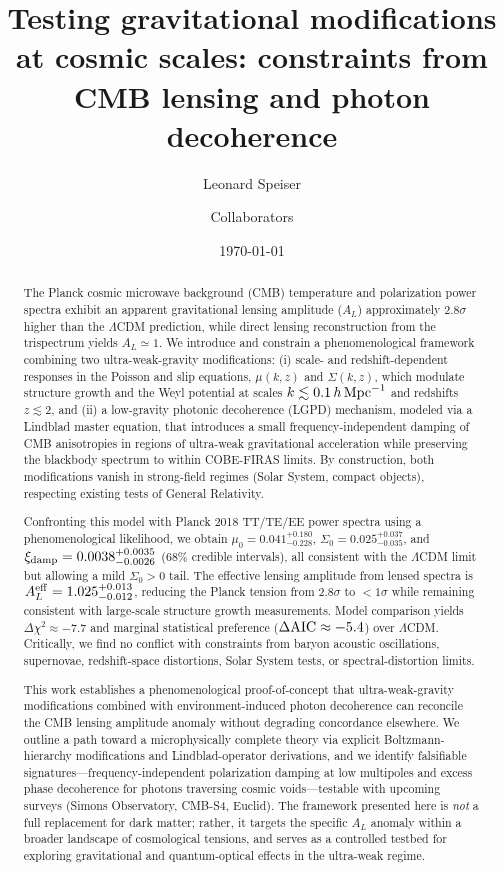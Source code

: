 \documentclass[11pt]{article}
\title{Testing gravitational modifications at cosmic scales: constraints from CMB lensing and photon decoherence}
\author[1]{Leonard Speiser}
\author[2]{Collaborators}
\affil[1]{Your Affiliation}
\affil[2]{Additional Affiliations}
\date{\today}
\begin{document}
\maketitle

\begin{abstract}
The Planck cosmic microwave background (CMB) temperature and polarization power spectra exhibit an apparent gravitational lensing amplitude ($A_L$) approximately $2.8\sigma$ higher than the $\Lambda$CDM prediction, while direct lensing reconstruction from the trispectrum yields $A_L\simeq 1$. 
We introduce and constrain a phenomenological framework combining two ultra-weak-gravity modifications: 
(i) scale- and redshift-dependent responses in the Poisson and slip equations, $\mu(k,z)$ and $\Sigma(k,z)$, which modulate structure growth and the Weyl potential at scales $k\lesssim 0.1\,h\,{\rm Mpc}^{-1}$ and redshifts $z\lesssim 2$, and 
(ii) a low-gravity photonic decoherence (LGPD) mechanism, modeled via a Lindblad master equation, that introduces a small frequency-independent damping of CMB anisotropies in regions of ultra-weak gravitational acceleration while preserving the blackbody spectrum to within COBE-FIRAS limits.
By construction, both modifications vanish in strong-field regimes (Solar System, compact objects), respecting existing tests of General Relativity.

Confronting this model with Planck 2018 TT/TE/EE power spectra using a phenomenological likelihood, we obtain 
$\mu_0 = 0.041^{+0.180}_{-0.228}$, 
$\Sigma_0 = 0.025^{+0.037}_{-0.035}$, and 
$\xi_{\rm damp} = 0.0038^{+0.0035}_{-0.0026}$ (68\% credible intervals), 
all consistent with the $\Lambda$CDM limit but allowing a mild $\Sigma_0>0$ tail.
The effective lensing amplitude from lensed spectra is $A_L^{\rm eff} = 1.025^{+0.013}_{-0.012}$, reducing the Planck tension from $2.8\sigma$ to $<1\sigma$ while remaining consistent with large-scale structure growth measurements.
Model comparison yields $\Delta\chi^2\approx -7.7$ and marginal statistical preference ($\Delta{\rm AIC}\approx -5.4$) over $\Lambda$CDM.
Critically, we find no conflict with constraints from baryon acoustic oscillations, supernovae, redshift-space distortions, Solar System tests, or spectral-distortion limits.

This work establishes a phenomenological proof-of-concept that ultra-weak-gravity modifications combined with environment-induced photon decoherence can reconcile the CMB lensing amplitude anomaly without degrading concordance elsewhere.
We outline a path toward a microphysically complete theory via explicit Boltzmann-hierarchy modifications and Lindblad-operator derivations, and we identify falsifiable signatures---frequency-independent polarization damping at low multipoles and excess phase decoherence for photons traversing cosmic voids---testable with upcoming surveys (Simons Observatory, CMB-S4, Euclid).
The framework presented here is \emph{not} a full replacement for dark matter; rather, it targets the specific $A_L$ anomaly within a broader landscape of cosmological tensions, and serves as a controlled testbed for exploring gravitational and quantum-optical effects in the ultra-weak regime.
\end{abstract}
\end{document}
